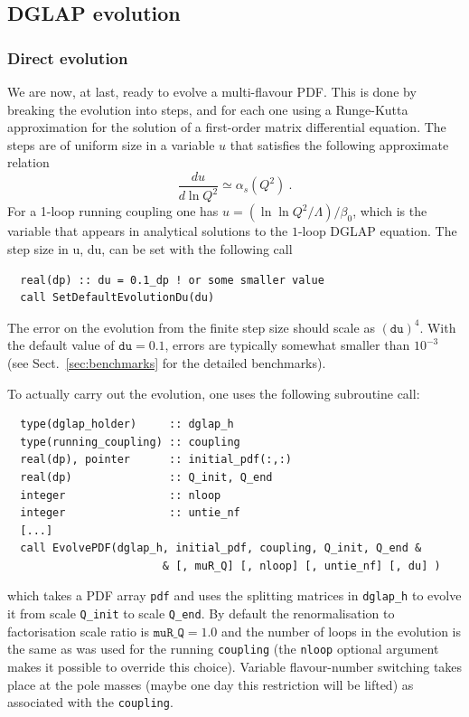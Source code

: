 \documentclass[12pt]{article}
\newcommand{\as}{\alpha_s}
\newcommand{\ttt}[1]{\texttt{#1}}
\begin{document}
\subsection{DGLAP evolution}
\label{sec:dglap-ev}


\subsubsection{Direct evolution}
\label{sec:direct-evolution}

We are now, at last,
 ready to evolve a multi-flavour PDF. This is done by breaking the
evolution into steps, and for each one using a Runge-Kutta
approximation for the solution of a first-order matrix differential
equation. The steps are of uniform size in a variable $u$ that
satisfies the following approximate relation
\begin{equation}
  \label{eq:du}
  \frac{du}{d\ln Q^2} \simeq \as(Q^2) \ .
\end{equation}
For a 1-loop running coupling one has $u = (\ln \ln
Q^2/\Lambda)/\beta_0$, which is the variable that appears in
analytical solutions to the $1$-loop DGLAP equation.
%
The step size in u, du, can be set with the following call
\begin{lstlisting}
  real(dp) :: du = 0.1_dp ! or some smaller value
  call SetDefaultEvolutionDu(du)
\end{lstlisting}
The error on the evolution from the finite step size should scale as
$(\ttt{du})^4$. With the default value of $\ttt{du}=0.1$, errors are
typically somewhat smaller than $10^{-3}$ (see
Sect.~\ref{sec:benchmarks} for the detailed benchmarks).

To actually carry out the evolution, one uses the following subroutine
call:
\begin{lstlisting}
  type(dglap_holder)     :: dglap_h
  type(running_coupling) :: coupling
  real(dp), pointer      :: initial_pdf(:,:)
  real(dp)               :: Q_init, Q_end
  integer                :: nloop
  integer                :: untie_nf
  [...]
  call EvolvePDF(dglap_h, initial_pdf, coupling, Q_init, Q_end &
                        & [, muR_Q] [, nloop] [, untie_nf] [, du] )
\end{lstlisting}
which takes a PDF array 
\ttt{pdf} and uses the splitting matrices in \ttt{dglap\_h}  to
evolve it from scale \ttt{Q\_init} to scale \ttt{Q\_end}.
%
By default the renormalisation to factorisation scale ratio is
$\ttt{muR\_Q} = 1.0$ and the number of loops in the evolution is the
same as was used for the running \ttt{coupling} (the \ttt{nloop}
optional argument makes it possible to override this choice). Variable
flavour-number switching takes place at the pole masses (maybe one day
this restriction will be lifted) as associated with the
\ttt{coupling}. 
\end{document}
